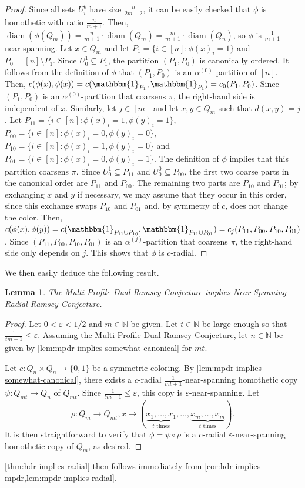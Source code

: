 \documentclass[11pt]{article}
\DeclareMathOperator{\diam}{diam}
\newtheorem{lemma}[theorem]{Lemma}
\theoremstyle{remark}
\begin{document}
\begin{proof}
Since all sets $U_i^b$ have size $\frac{n}{2m+2}$, it can be easily checked that $\phi$ is homothetic with ratio $\frac{n}{m+1}$.
Then, $\diam(\phi(Q_m)) = \frac{n}{m+1} \cdot \diam(Q_m) = \frac{m}{m+1} \cdot \diam(Q_n)$, so $\phi$ is $\frac{1}{m+1}$-near-spanning.
Let $x \in Q_m$ and let $P_1 = \{i \in [n] : \phi(x)_i = 1\}$ and $P_0 = [n] \setminus P_1$.
Since $U^1_0 \subseteq P_1$, the partition $(P_{1}, P_0)$ is canonically ordered.
It follows from the definition of $\phi$ that $(P_1, P_0)$ is an $\alpha^{(0)}$-partition of $[n]$.
Then, $c(\phi(x), \phi(x)) = c(\mathbbm{1}_{P_1}, \mathbbm{1}_{P_1}) = c_0(P_1, P_0)$.
Since $(P_1, P_0)$ is an $\alpha^{(0)}$-partition that coarsens $\pi$, the right-hand side is independent of $x$.
Similarly, let $j \in [m]$ and let $x, y \in Q_m$ such that $d(x, y) = j$.
Let $P_{11} = \{i \in [n] : \phi(x)_i = 1, \phi(y)_i = 1\}$, $P_{00} = \{i \in [n] : \phi(x)_i = 0, \phi(y)_i = 0\}$, $P_{10} = \{i \in [n] : \phi(x)_i = 1, \phi(y)_i = 0\}$ and $P_{01} = \{i \in [n] : \phi(x)_i = 0, \phi(y)_i = 1\}$.
The definition of $\phi$ implies that this partition coarsens $\pi$.
Since $U_0^1\subseteq P_{11}$ and $U_0^0\subseteq P_{00}$, the first two coarse parts in the canonical order are $P_{11}$ and $P_{00}$. 
The remaining two parts are $P_{10}$ and $P_{01}$; by exchanging $x$ and $y$ if necessary, we may assume that they occur in this order, since this exchange swaps $P_{10}$ and $P_{01}$ and, by symmetry of $c$, does not change the color.
Then, $c(\phi(x), \phi(y)) = c(\mathbbm{1}_{P_{11} \cup P_{10}}, \mathbbm{1}_{P_{11} \cup P_{01}}) = c_j(P_{11}, P_{00}, P_{10}, P_{01})$.
Since $(P_{11}, P_{00}, P_{10}, P_{01})$ is an $\alpha^{(j)}$-partition that coarsens $\pi$, the right-hand side only depends on $j$.
This shows that $\phi$ is $c$-radial.
\end{proof}

We then easily deduce the following result.

\begin{lemma}\label{lem:mpdr-implies-radial}
    The Multi-Profile Dual Ramsey Conjecture implies Near-Spanning Radial Ramsey Conjecture.
\end{lemma}

\begin{proof}
    Let $0 < \varepsilon < 1/2$ and $m \in \mathbb{N}$ be given.
    Let $t \in \mathbb{N}$ be large enough so that $\frac{1}{tm+1} \leq \varepsilon$.
    Assuming the Multi-Profile Dual Ramsey Conjecture, let $n \in \mathbb{N}$ be given by \cref{lem:mpdr-implies-somewhat-canonical} for $mt$.
    
    Let $c : Q_n \times Q_n \to \{0, 1\}$ be a symmetric coloring.
    By \cref{lem:mpdr-implies-somewhat-canonical}, there exists a $c$-radial $\frac{1}{mt+1}$-near-spanning homothetic copy $\psi : Q_{mt} \to Q_n$ of $Q_{mt}$.
    Since $\frac{1}{tm+1} \leq \varepsilon$, this copy is $\varepsilon$-near-spanning.
    Let \[\rho : Q_m \to Q_{mt}, x \mapsto (\underbrace{x_1,\ldots,x_1}_{t\text{ times}},
    \ldots,
    \underbrace{x_m,\ldots,x_m}_{t\text{ times}}).\]
    It is then straightforward to verify that $\phi = \psi \circ \rho$ is a $c$-radial $\varepsilon$-near-spanning homothetic copy of $Q_m$, as desired.
\end{proof}

\cref{thm:hdr-implies-radial} then follows immediately from \cref{cor:hdr-implies-mpdr,lem:mpdr-implies-radial}.
\end{document}
